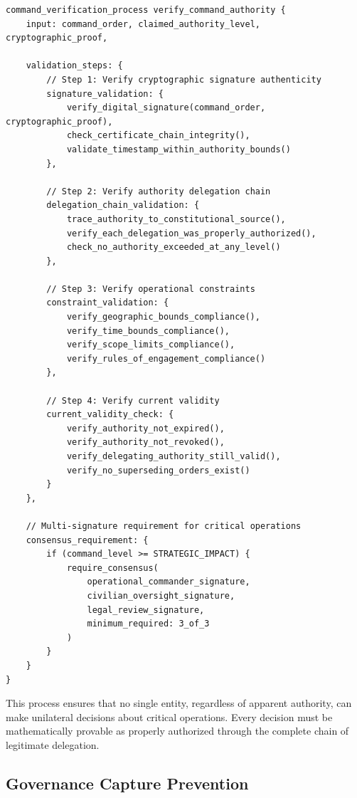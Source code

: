 \begin{lstlisting}[language=rift, caption=Authority Verification Process]
command_verification_process verify_command_authority {
    input: command_order, claimed_authority_level, cryptographic_proof,
    
    validation_steps: {
        // Step 1: Verify cryptographic signature authenticity
        signature_validation: {
            verify_digital_signature(command_order, cryptographic_proof),
            check_certificate_chain_integrity(),
            validate_timestamp_within_authority_bounds()
        },
        
        // Step 2: Verify authority delegation chain
        delegation_chain_validation: {
            trace_authority_to_constitutional_source(),
            verify_each_delegation_was_properly_authorized(),
            check_no_authority_exceeded_at_any_level()
        },
        
        // Step 3: Verify operational constraints
        constraint_validation: {
            verify_geographic_bounds_compliance(),
            verify_time_bounds_compliance(),
            verify_scope_limits_compliance(),
            verify_rules_of_engagement_compliance()
        },
        
        // Step 4: Verify current validity
        current_validity_check: {
            verify_authority_not_expired(),
            verify_authority_not_revoked(),
            verify_delegating_authority_still_valid(),
            verify_no_superseding_orders_exist()
        }
    },
    
    // Multi-signature requirement for critical operations
    consensus_requirement: {
        if (command_level >= STRATEGIC_IMPACT) {
            require_consensus(
                operational_commander_signature,
                civilian_oversight_signature,
                legal_review_signature,
                minimum_required: 3_of_3
            )
        }
    }
}
\end{lstlisting}

This process ensures that no single entity, regardless of apparent authority, can make unilateral decisions about critical operations. Every decision must be mathematically provable as properly authorized through the complete chain of legitimate delegation.

\subsection{Governance Capture Prevention}

